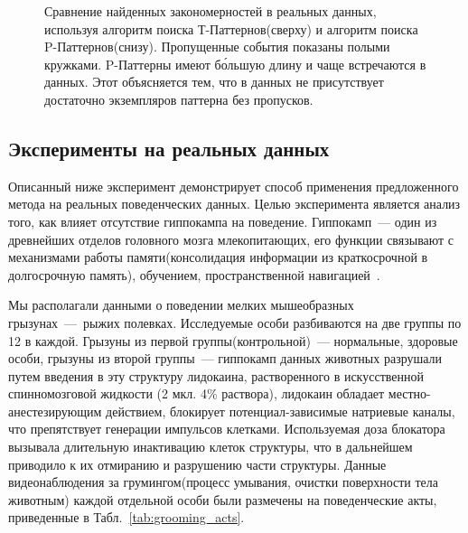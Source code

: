 \documentclass[12pt,fсeqn]{article}
\begin{document}
\begin{figure}[H]
\noindent{}
\caption{ Сравнение найденных закономерностей в реальных данных, используя алгоритм поиска Т-Паттернов(сверху)
и алгоритм поиска P-Паттернов(снизу). Пропущенные события показаны полыми кружками. P-Паттерны имеют б\'{о}льшую длину
и чаще встречаются в данных. Этот объясняется тем, что в данных не присутствует достаточно экземпляров паттерна без пропусков. }
\label{fig:tp_fp_missed}
\end{figure}

\subsection{Эксперименты на реальных данных}
Описанный ниже эксперимент демонстрирует способ применения предложенного метода на реальных поведенческих
данных. Целью эксперимента является анализ того, как влияет отсутствие гиппокампа
на поведение. Гиппокамп~--- один из древнейших отделов головного мозга млекопитающих, его функции 
связывают с механизмами работы памяти(консолидация информации из краткосрочной в долгосрочную память), обучением, пространственной
навигацией~\cite[c.~744]{Neuro_exploring_the_brain}.

Мы располагали данными о поведении мелких мышеобразных грызунах~---~рыжих полевках. Исследуемые особи
разбиваются на две группы по 12 в каждой. Грызуны из первой группы(контрольной)~--- нормальные, здоровые особи,
грызуны из второй группы~--- гиппокамп данных животных разрушали путем введения в эту структуру лидокаина, растворенного в искусственной спинномозговой жидкости (2 мкл. 4\% 
раствора), лидокаин обладает местно-анестезирующим действием, блокирует потенциал-зависимые натриевые каналы, что препятствует генерации импульсов клетками. 
Используемая доза блокатора вызывала длительную инактивацию клеток структуры, что в дальнейшем приводило к их отмиранию и разрушению части структуры. Данные
видеонаблюдения за грумингом(процесс умывания, очистки поверхности тела животным) каждой отдельной
особи были размечены  на поведенческие акты, приведенные в Табл.~\ref{tab:grooming_acts}. 
\end{document}
